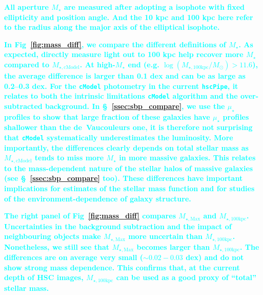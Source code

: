 \documentclass[a4paper,fleqn,usenatbib]{mnras}
\def\cmodel{\texttt{cModel}}
\def\mstar{{$M_{\star}$}}
\def\mtot{{$M_{\star,100\mathrm{kpc}}$}}
\def\mmax{{$M_{\star,\mathrm{Max}}$}}
\def\mcmodel{{$M_{\star,\mathrm{cModel}}$}}
\def\logmtot{{$\log (M_{\star,100\mathrm{kpc}}/M_{\odot})$}}
\def\mden{{$\mu_{\star}$}}
\newcommand{\song}[1]{\textcolor{cyan}{\textbf{#1}}}
\begin{document}
    \song{
    All aperture \mstar{} are measured after adopting a isophote with fixed 
    ellipticity and position angle. 
    And the 10 kpc and 100 kpc here refer to the radius along the major axis of the 
    elliptical isophote.
    }
       
    
    \song{
    In Fig~\ref{fig:mass_diff}, we compare the different definitions of \mstar{}. 
    As expected, directly measure light out to 100 kpc help recover more \mstar{} 
    compared to \mcmodel{}.
    At high-\mstar{} end (e.g. \logmtot{}$>11.6$), the average difference is larger 
    than 0.1 dex and can be as large as 0.2--0.3 dex.  
    For the \cmodel{} photometry in the current \texttt{hscPipe}, it relates to 
    both the intrinsic limitations \cmodel{} algorithm and the over-subtracted 
    background. 
    In \S~\ref{ssec:sbp_compare}, we use the \mden{} profiles to show that large 
    fraction of these galaxies have \mden{} profiles shallower than the de~Vaucouleurs 
    one, it is therefore not surprising that \cmodel{} systematically underestimates 
    the luminosity.
    More importantly, the differences clearly depends on total stellar mass as 
    \mcmodel{} tends to miss more \mstar{} in more massive galaxies.  
    This relates to the mass-dependent nature of the stellar halos of massive 
    galaxies (see \S~\ref{ssec:sbp_compare} too).
    These differences have important implications for estimates of the stellar 
    mass function and for studies of the environment-dependence of galaxy structure. 
    }
    
    \song{
    The right panel of Fig~\ref{fig:mass_diff} compares \mmax{} and \mtot{}.  
    Uncertainties in the background subtraction and the impact of neighbouring 
    objects make \mmax{} more uncertain than \mtot{}. 
    Nonetheless, we still see that \mmax{} becomes larger than \mtot{}. 
    The differences are on average very small ($\sim0.02-0.03$ dex) and do not show 
    strong mass dependence.  
    This confirms that, at the current depth of HSC images, \mtot{} can be used as 
    a good proxy of ``total'' stellar mass. 
    }  
   
\end{document}
